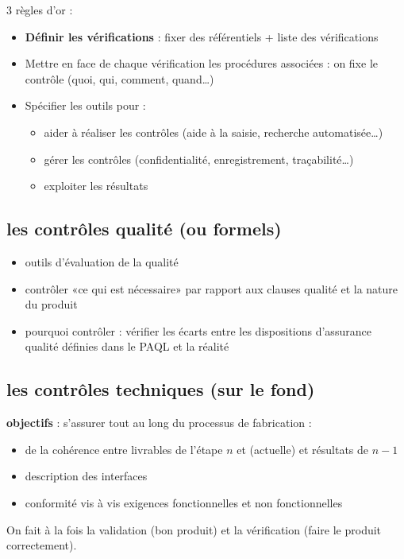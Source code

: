 3 règles d’or :
\begin{itemize}
	\item \textbf{Définir les vérifications} : fixer des référentiels + liste des vérifications
	\item Mettre en face de chaque vérification les procédures associées : on fixe le contrôle (quoi, qui, comment, quand\ldots)
	\item Spécifier les outils pour : 
	\begin{itemize}
		\item aider à réaliser les contrôles (aide à la saisie, recherche automatisée\ldots) 
		\item gérer les contrôles (confidentialité, enregistrement, traçabilité\ldots)
		\item exploiter les résultats
	\end{itemize}
\end{itemize}

	\subsection{les contrôles qualité (ou formels)}

	\begin{itemize}
		\item outils d’évaluation de la qualité
		\item contrôler «ce qui est nécessaire» par rapport aux clauses qualité et la nature du produit
		\item pourquoi contrôler : vérifier les écarts entre les dispositions d’assurance qualité définies dans le PAQL et la réalité
	\end{itemize}

	\subsection{les contrôles techniques (sur le fond)}
	\textbf{objectifs} : s’assurer tout au long du processus de fabrication :
	\begin{itemize}
		\item de la cohérence entre livrables de l’étape $n$ et (actuelle) et résultats de $n-1$
		\item description des interfaces
		\item conformité vis à vis exigences fonctionnelles et non fonctionnelles
	\end{itemize}

On fait à la fois la validation (bon produit) et la vérification (faire le produit correctement).

